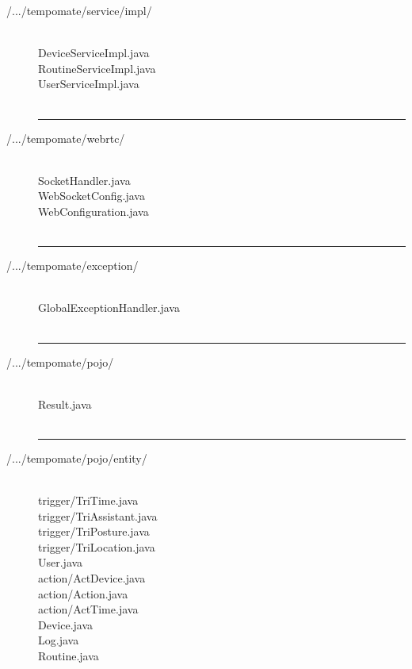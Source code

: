 \begin{enumerate}[label=\alph*]
\begin{description}
        \item[/.../tempomate/service/impl/] \hfill \\
        \footnotesize
DeviceServiceImpl.java \\
RoutineServiceImpl.java \\
UserServiceImpl.java \\\\
    \vspace{-0.2cm}
    \hrule
    \vspace{0.2cm}

        \item[/.../tempomate/webrtc/] \hfill \\
        \footnotesize
SocketHandler.java \\
WebSocketConfig.java \\
WebConfiguration.java \\\\
    \vspace{-0.2cm}
    \hrule
    \vspace{0.2cm}

        \item[/.../tempomate/exception/] \hfill \\
        \footnotesize
GlobalExceptionHandler.java \\\\

    \vspace{-0.2cm}
    \hrule
    \vspace{0.2cm}

        \item[/.../tempomate/pojo/] \hfill \\
        \footnotesize
Result.java \\\\
    \vspace{-0.2cm}
    \hrule
    \vspace{0.2cm}
    
        \item[/.../tempomate/pojo/entity/] \hfill \\
        \footnotesize
trigger/TriTime.java \\
trigger/TriAssistant.java \\
trigger/TriPosture.java \\
trigger/TriLocation.java \\
User.java \\
action/ActDevice.java \\
action/Action.java \\
action/ActTime.java \\
Device.java \\
Log.java \\
Routine.java \\\\\\


\end{description}
\end{enumerate}
